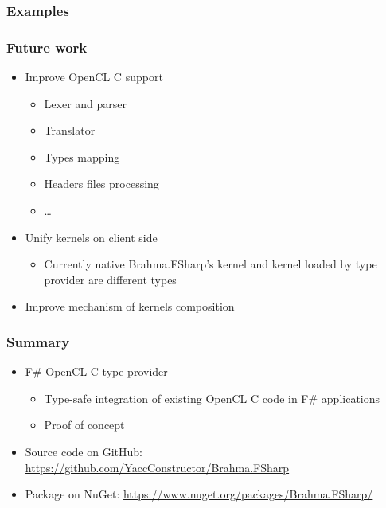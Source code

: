 \documentclass[xcolor=table]{beamer}
\begin{document}
            
\begin{frame}
  \transwipe[direction=90]
  \frametitle{Examples}         

\end{frame}     

\begin{frame}
  \transwipe[direction=90]
  \frametitle{Future work}         
\begin{itemize}
\item Improve OpenCL C support
\begin{itemize}
\item Lexer and parser
\item Translator 
\item Types mapping
\item Headers files processing
\item \dots
\end{itemize}
\item Unify kernels on client side
\begin{itemize}
\item Currently native Brahma.FSharp's kernel and kernel loaded by type provider are different 
types
\end{itemize}
\item Improve mechanism of kernels composition
\end{itemize}
\end{frame}     
            
            
\begin{frame}
  \transwipe[direction=90]
  \frametitle{Summary}         
\begin{itemize}
\item F\# OpenCL C type provider
\begin {itemize}
\item Type-safe integration of existing OpenCL C code in F\# applications
\item Proof of concept
\end{itemize}
\vspace{1cm}
\item Source code on GitHub: \url{https://github.com/YaccConstructor/Brahma.FSharp}
\item Package on NuGet: \url{https://www.nuget.org/packages/Brahma.FSharp/}
\end{itemize}
\end{frame}           
            
\end{document}
